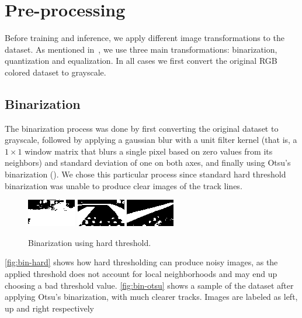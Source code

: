 
\chapter{Pre-processing}\label{chp:preprocessing}

Before training and inference, we apply different image transformations to the dataset. As
mentioned in~, we use three main transformations: binarization, quantization
and equalization. In all cases we first convert the original RGB colored dataset to grayscale.

\section{Binarization}

The binarization process was done by first converting the original dataset to grayscale, followed
by applying a gaussian blur with a unit filter kernel (that is, a $1\times 1$ window matrix that
blurs a single pixel based on zero values from its neighbors) and standard deviation of one on both
axes, and finally using Otsu's binarization (\cite{otsu}). We chose this particular process since
standard hard threshold binarization was unable to produce clear images of the track lines.

\begin{figure}[h]
  \centering
  \includegraphics[scale=1.75]{imgs/binary_left_h.png}
  \includegraphics[scale=1.75]{imgs/binary_up_h.png}
  \includegraphics[scale=1.75]{imgs/binary_right_h.png}
  \caption{Binarization using hard threshold.\label{fig:bin-hard}}
\end{figure}

\autoref{fig:bin-hard} shows how hard thresholding can produce noisy images, as the applied
threshold does not account for local neighborhoods and may end up choosing a bad threshold value.
\autoref{fig:bin-otsu} shows a sample of the dataset after applying Otsu's binarization, with much
clearer tracks. Images are labeled as left, up and right respectively


